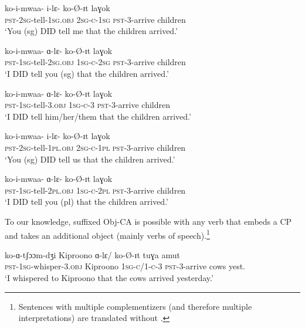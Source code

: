 \documentclass[output=paper,newtxmath,modfonts,nonflat,hidelinks]{langsci/langscibook}
\begin{document}
\ea \label{Obj CA Examples} 
\begin{xlist}

\ex \gll ko-i-mwaa- i-lɛ- ko-\O-ɪt laɣok \\
\textsc{pst}-2\textsc{sg}-tell-1\textsc{sg}.\textsc{obj} 2\textsc{sg-c-}1\textsc{sg} \textsc{pst}-3-arrive children \\ 
\glt `You (sg) DID tell me that the children arrived.'

\ex \gll ko-i-mwaa- ɑ-lɛ- ko-\O-ɪt laɣok \\
\textsc{pst}-1\textsc{sg}-tell-2\textsc{sg}.\textsc{obj} 1\textsc{sg-c-}2\textsc{sg} \textsc{pst}-3-arrive children \\
\glt `I DID tell you (sg) that the children arrived.'

\ex \gll ko-i-mwaa- ɑ-lɛ- ko-\O-ɪt laɣok \\
\textsc{pst}-1\textsc{sg}-tell-3.\textsc{obj} 1\textsc{sg-c}-3 \textsc{pst}-3-arrive children \\
\glt `I DID tell him/her/them that the children arrived.'

\ex \gll ko-i-mwaa- i-lɛ- ko-\O-ɪt laɣok \\
\textsc{pst}-2\textsc{sg}-tell-1\textsc{pl}.\textsc{obj} 2\textsc{sg-c-}1\textsc{pl} \textsc{pst}-3-arrive children \\
\glt `You (sg) DID tell us that the children arrived.'

\ex \gll ko-i-mwaa- ɑ-lɛ- ko-\O-ɪt laɣok \\
\textsc{pst}-1\textsc{sg}-tell-2\textsc{pl}.\textsc{obj} 1\textsc{sg-c-}2\textsc{pl} \textsc{pst}-3-arrive children \\
\glt `I DID tell you (pl) that the children arrived.'

\end{xlist}
\z

\noindent To our knowledge, suffixed Obj-CA is possible with any verb that embeds a CP and takes an additional object (mainly verbs of speech).\footnote{Sentences with multiple complementizers (and therefore multiple interpretations) are translated without .} 

\ea 
\gll ko-ɑ-tʃɔɔm-dʒi Kiproono ɑ-lɛ/ ko-\O-ɪt tuɣa amut \\
\textsc{pst}-1\textsc{sg}-whisper-3.\textsc{obj} Kiproono 1\textsc{sg-c/}1\textsc{-c}-3 \textsc{pst}-3-arrive cows yest. \\
\glt `I whispered to Kiproono that the cows arrived yesterday.' 
\z
\end{document}
